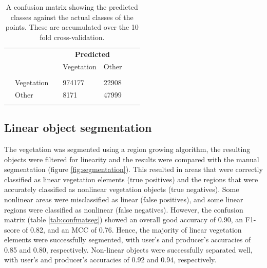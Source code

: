 \begin{table}
	\caption{A confusion matrix showing the predicted classes against the actual classes of the points. These are accumulated over the 10 fold cross-validation.}
	\label{tab:confmatclass}
	\begin{tabular}{l l l l l l l}
		\toprule
		& & & \multicolumn{2}{c}{\textbf{Predicted}} & & \\
		& & & Vegetation & Other & & \\
		\midrule
		\parbox[t]{2mm}{} & & & & & & \\
		& Vegetation & & 974177 & 22908 & & \\
		& Other & & 8171 & 47999 & & \\
		& & & & & & \\
		\bottomrule
	\end{tabular}
\end{table}

\subsection{Linear object segmentation}
The vegetation was segmented using a region growing algorithm, the resulting objects were filtered for linearity and the results were compared with the manual segmentation (figure \ref{fig:segmentation}). This resulted in areas that were correctly classified as linear vegetation elements (true positives) and the regions that were accurately classified as nonlinear vegetation objects (true negatives). Some nonlinear areas were misclassified as linear (false positives), and some linear regions were classified as nonlinear (false negatives). However, the confusion matrix (table \ref{tab:confmatseg}) showed an overall good accuracy of 0.90, an F1-score of 0.82, and an MCC of 0.76. Hence, the majority of linear vegetation elements were successfully segmented, with user's and producer's accuracies of 0.85 and 0.80, respectively. Non-linear objects were successfully separated well, with user's and producer's accuracies of 0.92 and 0.94, respectively.

